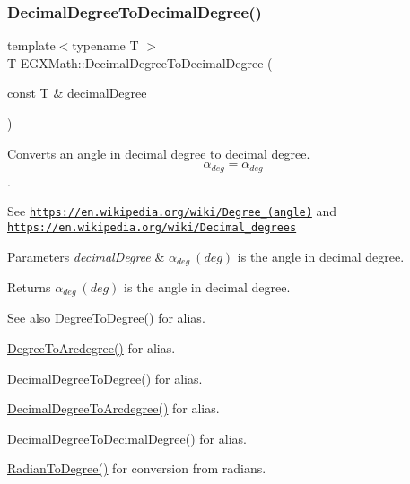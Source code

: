 \subsubsection{\texorpdfstring{Decimal\+Degree\+To\+Decimal\+Degree()}{DecimalDegreeToDecimalDegree()}}
{\footnotesize\ttfamily template$<$typename T $>$ \\
T E\+G\+X\+Math\+::\+Decimal\+Degree\+To\+Decimal\+Degree (\begin{DoxyParamCaption}\item[{const T \&}]{decimal\+Degree }\end{DoxyParamCaption})}



Converts an angle in decimal degree to decimal degree. \[\alpha_{deg}=\alpha_{deg}\]. 

See \href{https://en.wikipedia.org/wiki/Degree_(angle)}{\tt https\+://en.\+wikipedia.\+org/wiki/\+Degree\+\_\+(angle)} and \href{https://en.wikipedia.org/wiki/Decimal_degrees}{\tt https\+://en.\+wikipedia.\+org/wiki/\+Decimal\+\_\+degrees} 
\begin{DoxyParams}{Parameters}
{\em decimal\+Degree} & $\alpha_{deg}\ (deg)$ is the angle in decimal degree. \\
\hline
\end{DoxyParams}
\begin{DoxyReturn}{Returns}
$\alpha_{deg}\ (deg)$ is the angle in decimal degree. 
\end{DoxyReturn}
\begin{DoxySeeAlso}{See also}
\mbox{\hyperlink{group___e_g_x_math-_angle_conversions-_degree_gaca157e7d3e99a46a11a04b92680d2574}{Degree\+To\+Degree()}} for alias. 

\mbox{\hyperlink{group___e_g_x_math-_angle_conversions-_degree_gac1b5f3b68f66c77a6df4ceef842c9b19}{Degree\+To\+Arcdegree()}} for alias. 

\mbox{\hyperlink{group___e_g_x_math-_angle_conversions-_decimal_degree_ga0aa7f2f5dbb00cf4ab303421c6e33ccf}{Decimal\+Degree\+To\+Degree()}} for alias. 

\mbox{\hyperlink{group___e_g_x_math-_angle_conversions-_decimal_degree_gacdd463fcabffeb598ebda65b012ce743}{Decimal\+Degree\+To\+Arcdegree()}} for alias. 

\mbox{\hyperlink{group___e_g_x_math-_angle_conversions-_decimal_degree_gafccf9cd779903872887978ab9d79661f}{Decimal\+Degree\+To\+Decimal\+Degree()}} for alias. 

\mbox{\hyperlink{group___e_g_x_math-_angle_conversions-_radian_ga25bbce6cdc1c3621f2a158d320e3bc45}{Radian\+To\+Degree()}} for conversion from radians. 
\end{DoxySeeAlso}
\mbox{\label{group___e_g_x_math-_angle_conversions-_decimal_degree_ga0aa7f2f5dbb00cf4ab303421c6e33ccf}} 
